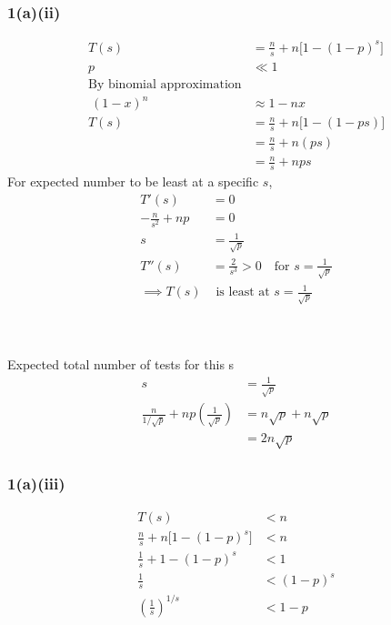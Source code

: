 \documentclass[12pt]{article}
\begin{document}
\subsubsection{1(a)(ii)}
\begin{align*}
T(s) &= \frac{n}{s} + n\big[1-(1-p)^s\big] \\
p &\ll 1 \\
\text{By binomial approximation} \\
 \ (1-x)^n &\approx 1-nx \\
T(s) &= \frac{n}{s} + n\Big[1-(1-ps)\Big] \\
&= \frac{n}{s} + n(ps) \\
&= \frac{n}{s} + nps
\end{align*}
For expected number to be least at a specific $s$,
\begin{align*}
T'(s) &= 0 \\
-\frac{n}{s^2} + np &= 0 \\
s &= \frac{1}{\sqrt{p}} \\
T''(s) &= \frac{2}{s^3} > 0 \quad \text{for } s=\frac{1}{\sqrt{p}} \\
\implies T(s) &\text{ is least at } s=\frac{1}{\sqrt{p}}
\end{align*}

\begin{center}
\end{center}
\\
\\
Expected total number of tests for this s
\begin{align*}
s &= \frac{1}{\sqrt{p}} \\
\frac{n}{1/\sqrt{p}} + np\left(\frac{1}{\sqrt{p}}\right) 
&= n\sqrt{p} + n\sqrt{p} \\
&= 2n\sqrt{p}
\end{align*}
\begin{center}
\end{center}
\subsubsection{1(a)(iii)}
\begin{align*}
T(s) &< n \\
\frac{n}{s} + n\big[1-(1-p)^s\big] &< n \\
\frac{1}{s} + 1-(1-p)^s &< 1 \\
\frac{1}{s} &< (1-p)^s \\
\left(\frac{1}{s}\right)^{1/s} &< 1-p \\
\end{align*}
\begin{center}
    
\end{center}
\end{document}
